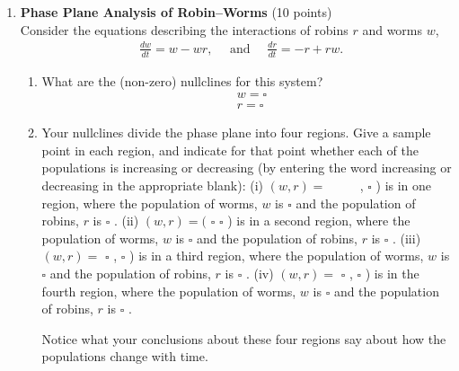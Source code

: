 \begin{enumerate}
  \item \textbf{Phase Plane Analysis of Robin–Worms} (10 points)\\
  Consider the equations describing the interactions of robins $r$ and worms $w$,
  $$
  \begin{aligned}
  & \frac{d w}{d t}=w-w r, \quad \text { and } \quad \frac{d r}{d t}=-r+r w .
  \end{aligned}
  $$
  \begin{enumerate}[label=(\alph*)]
    \item What are the (non-zero) nullclines for this system?
    $$
    \begin{aligned}
    & w=\square \\
    & r=\square
    \end{aligned}
    $$
    \begin{subanswer}
    \end{subanswer}
    \item Your nullclines divide the phase plane into four regions. Give a sample point in each region, and indicate for that point whether each of the populations is increasing or decreasing (by entering the word increasing or decreasing in the appropriate blank):
    (i) $(w, r)=$ $\qquad$ , $\square$ ) is in one region, where the population of worms, $w$ is $\square$ and the population of robins, $r$ is $\square$ .
    (ii) $(w, r)=($ $\square$
    $\square$ ) is in a second region, where the population of worms, $w$ is $\square$ and the population of robins, $r$ is $\square$ .
    (iii) $(w, r)=$ $\square$ , $\square$ ) is in a third region, where the population of worms, $w$ is $\square$ and the population of robins, $r$ is $\square$ .
    (iv) $(w, r)=$ $\square$ , $\square$ ) is in the fourth region, where the population of worms, $w$ is $\square$ and the population of robins, $r$ is $\square$ .
    \begin{subanswer}
    \end{subanswer}
    Notice what your conclusions about these four regions say about how the populations change with time.
  \end{enumerate}


\end{enumerate}
